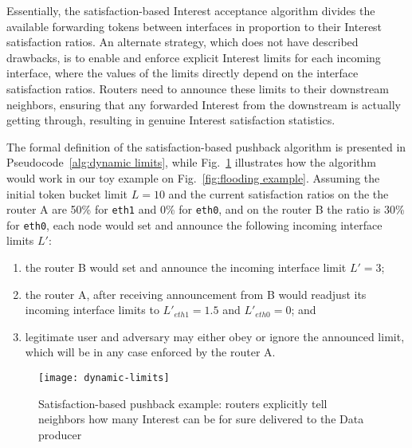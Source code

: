 

Essentially, the satisfaction-based Interest acceptance algorithm divides the available forwarding tokens between interfaces in proportion to their Interest satisfaction ratios.
An alternate strategy, which does not have described drawbacks, is to enable and enforce explicit Interest limits for each incoming interface, where the values of the limits directly depend on the interface satisfaction ratios.
Routers need to announce these limits to their downstream neighbors, ensuring that any forwarded Interest from the downstream is actually getting through, resulting in genuine Interest satisfaction statistics.

The formal definition of the satisfaction-based pushback algorithm is presented in Pseudocode~\ref{alg:dynamic limits}, while Fig.~\ref{fig:dynamic limits example} illustrates how the algorithm would work in our toy example on Fig.~\ref{fig:flooding example}.
Assuming the initial token bucket limit $L=10$ and the current satisfaction ratios on the the router A are 50\% for \texttt{eth1} and 0\% for \texttt{eth0}, and on the router B the ratio is 30\% for \texttt{eth0}, each node would set and announce the following  incoming interface limits $L'$: 
\begin{enumerate}
\item the router B would set and announce the incoming interface limit $L'=3$;
\item the router A, after receiving announcement from B would readjust its incoming interface limits to $L'_{eth1} = 1.5$ and $L'_{eth0} = 0$; and
\item legitimate user and adversary may either obey or ignore the announced limit, which will be in any case enforced by the router A.
\end{enumerate}


\begin{figure}[htbp]
  \centering
  \texttt{[image: dynamic-limits]}
  \caption{Satisfaction-based pushback example: routers explicitly tell neighbors how many Interest can be for sure delivered to the Data producer}
  \label{fig:dynamic limits example}
\end{figure}



